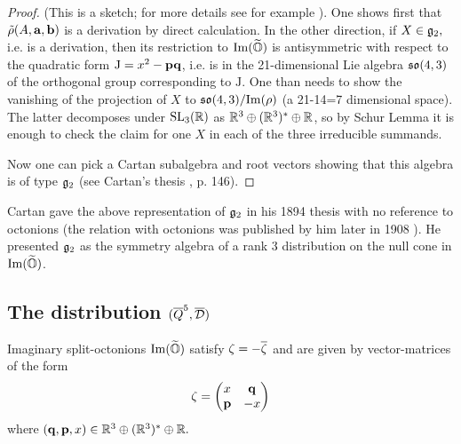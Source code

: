 \begin{proof} (This is a sketch; for more details see for example \cite{Katja}). One  shows first  that $\tilde\rho(A,{\bf a},{\bf b})$ is a derivation by direct calculation. In the other direction, if $X\in{\mathfrak{g}}_2,$ i.e. is a derivation, then its restriction to ${\rm Im}(\widetilde{\mathbb O})$ is antisymmetric with respect to  the quadratic form ${\mathrm J}=x^2-{\mathbf p}\mathbf q$, i.e. is in the 21-dimensional Lie algebra $\mathfrak{so}(4,3)$ of the orthogonal group corresponding to ${\mathrm J}$. One than needs  to show the vanishing of the  projection of $X$ to $\mathfrak{so}(4,3)/{\rm Im}(\rho)$ (a 21-14=7 dimensional space). The latter  decomposes under ${\mathrm{SL}_3(\mathbb{R})}$ as $\mathbb{R}^3\oplus(\mathbb{R}^3)^*\oplus\mathbb{R}$, so by Schur Lemma it is enough to check the claim for one $X$  in each of the three irreducible summands. 

Now one can pick a Cartan subalgebra and root vectors showing that this algebra is of type ${\mathfrak{g}}_2$ (see Cartan's thesis \cite{C_thesis}, p.  146).  
\end{proof}

\begin{rmrk}
Cartan gave the above representation of ${\mathfrak{g}}_2$ in his 1894 thesis \cite{C_thesis} with no reference to octonions (the relation with octonions was published by him later in 1908 \cite{Ca3}). He presented ${\mathfrak{g}}_2$ as the symmetry algebra of a rank 3 distribution on the null cone in ${\rm Im}(\widetilde{\mathbb O})$.
 \end{rmrk}

\subsection{The distribution  $(\overline{Q}^5,\overline{\mathcal D})$}\label{dist} 

%





Imaginary split-octonions ${\rm Im}(\widetilde{\mathbb O})$ satisfy  $\zeta=-\overline{\zeta}$ and are given by vector-matrices of the form 
$$\zeta=\left(\begin{matrix}x&\mathbf q \\ {\mathbf p}&-x\end{matrix}\right)$$ 
where $ (\mathbf q,{\mathbf p},x)\in\mathbb{R}^3\oplus(\mathbb{R}^3)^*\oplus\mathbb{R}.$

